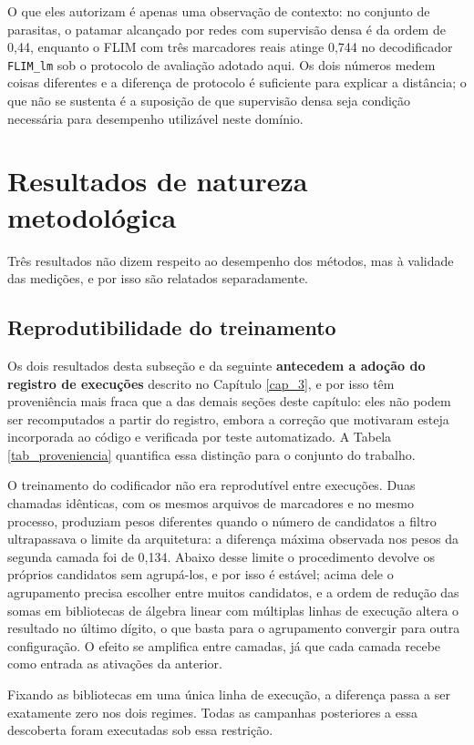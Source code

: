 O que eles autorizam é apenas uma observação de contexto: no conjunto de parasitas, o patamar alcançado por redes com supervisão densa é da ordem de 0,44, enquanto o \ac{FLIM} com três marcadores reais atinge 0,744 no decodificador \texttt{FLIM\_lm} sob o protocolo de avaliação adotado aqui. Os dois números medem coisas diferentes e a diferença de protocolo é suficiente para explicar a distância; o que não se sustenta é a suposição de que supervisão densa seja condição necessária para desempenho utilizável neste domínio.

\section{Resultados de natureza metodológica}

Três resultados não dizem respeito ao desempenho dos métodos, mas à validade das medições, e por isso são relatados separadamente.

\subsection{Reprodutibilidade do treinamento}

Os dois resultados desta subseção e da seguinte \textbf{antecedem a adoção do registro de execuções} descrito no Capítulo \ref{cap_3}, e por isso têm proveniência mais fraca que a das demais seções deste capítulo: eles não podem ser recomputados a partir do registro, embora a correção que motivaram esteja incorporada ao código e verificada por teste automatizado. A Tabela \ref{tab_proveniencia} quantifica essa distinção para o conjunto do trabalho.

O treinamento do codificador não era reprodutível entre execuções. Duas chamadas idênticas, com os mesmos arquivos de marcadores e no mesmo processo, produziam pesos diferentes quando o número de candidatos a filtro ultrapassava o limite da arquitetura: a diferença máxima observada nos pesos da segunda camada foi de 0,134. Abaixo desse limite o procedimento devolve os próprios candidatos sem agrupá-los, e por isso é estável; acima dele o agrupamento precisa escolher entre muitos candidatos, e a ordem de redução das somas em bibliotecas de álgebra linear com múltiplas linhas de execução altera o resultado no último dígito, o que basta para o agrupamento convergir para outra configuração. O efeito se amplifica entre camadas, já que cada camada recebe como entrada as ativações da anterior.

Fixando as bibliotecas em uma única linha de execução, a diferença passa a ser exatamente zero nos dois regimes. Todas as campanhas posteriores a essa descoberta foram executadas sob essa restrição.

